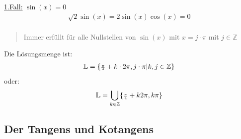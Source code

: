 \underline{1.Fall:} $ \sin(x)= 0 $\\
\begin{align*}
\sqrt{2}\sin(x)=2\sin(x)\cos(x)=0\\
\end{align*}
\begin{quote}
	Immer erfüllt für alle Nullstellen von $ \sin(x) $ mit $ x=j\cdot\pi $ mit $ j\in  \mathbb{Z} $
\end{quote}
Die Lösungsmenge ist:\\
\begin{align*}
\mathbb{L}=\{\genfrac{}{}{}{2}{\pi }{4 }+k \cdot 2 \pi, j\cdot \pi | k,j\in  \mathbb{Z}\}
\end{align*}
oder:\
\begin{align*}
\mathbb{L}=\underset{k\in \mathbb{Z}}{\bigcup}\{\genfrac{}{}{}{2}{\pi}{4}+k2\pi,k\pi\}\\
\end{align*}
\subsection{Der Tangens und Kotangens}
